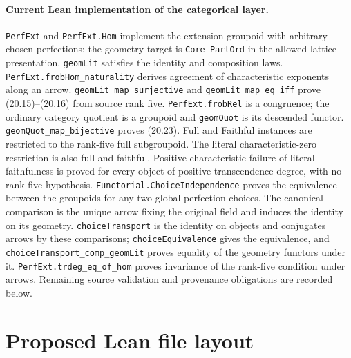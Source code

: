 \documentclass[11pt,oneside]{article}
\theoremstyle{definition}
\theoremstyle{remark}
\newcommand{\lean}[1]{\nolinkurl{#1}}
\begin{document}
\paragraph{Current Lean implementation of the categorical layer.}
\lean{PerfExt} and \lean{PerfExt.Hom} implement the extension groupoid with arbitrary
chosen perfections; the geometry target is \lean{Core PartOrd} in the allowed lattice
presentation.  \lean{geomLit} satisfies the identity and composition laws.
\lean{PerfExt.frobHom_naturality} derives agreement of characteristic exponents along
an arrow.  \lean{geomLit_map_surjective} and \lean{geomLit_map_eq_iff} prove
(20.15)--(20.16) from source rank five.  \lean{PerfExt.frobRel} is a congruence;
the ordinary category quotient is a groupoid and \lean{geomQuot} is its descended functor.
\lean{geomQuot_map_bijective} proves (20.23).  Full and Faithful instances are restricted
to the rank-five full subgroupoid.  The literal characteristic-zero restriction is also
full and faithful.  Positive-characteristic failure of literal faithfulness is proved
for every object of positive transcendence degree, with no rank-five hypothesis.
\lean{Functorial.ChoiceIndependence} proves the equivalence between the groupoids for any
two global perfection choices.  The canonical comparison is the unique arrow fixing the
original field and induces the identity on its geometry.  \lean{choiceTransport} is the
identity on objects and conjugates arrows by these comparisons;
\lean{choiceEquivalence} gives the equivalence, and
\lean{choiceTransport_comp_geomLit} proves equality of the geometry functors under it.
\lean{PerfExt.trdeg_eq_of_hom} proves invariance of the rank-five condition under arrows.
Remaining source validation and provenance obligations are recorded below.

\section{Proposed Lean file layout}
\end{document}
